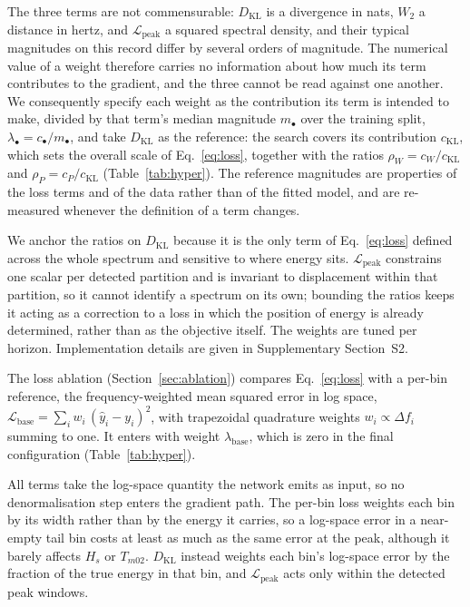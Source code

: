 The three terms are not commensurable: $D_{\text{KL}}$ is a divergence in nats, $W_2$ a distance in hertz, and $\mathcal{L}_{\text{peak}}$ a squared spectral density, and their typical magnitudes on this record differ by several orders of magnitude. The numerical value of a weight therefore carries no information about how much its term contributes to the gradient, and the three cannot be read against one another. We consequently specify each weight as the contribution its term is intended to make, divided by that term's median magnitude $m_\bullet$ over the training split, $\lambda_\bullet = c_\bullet / m_\bullet$, and take $D_{\text{KL}}$ as the reference: the search covers its contribution $c_{\text{KL}}$, which sets the overall scale of Eq.~\eqref{eq:loss}, together with the ratios $\rho_W = c_W / c_{\text{KL}}$ and $\rho_P = c_P / c_{\text{KL}}$ (Table~\ref{tab:hyper}). The reference magnitudes are properties of the loss terms and of the data rather than of the fitted model, and are re-measured whenever the definition of a term changes.

We anchor the ratios on $D_{\text{KL}}$ because it is the only term of Eq.~\eqref{eq:loss} defined across the whole spectrum and sensitive to where energy sits. $\mathcal{L}_{\text{peak}}$ constrains one scalar per detected partition and is invariant to displacement within that partition, so it cannot identify a spectrum on its own; bounding the ratios keeps it acting as a correction to a loss in which the position of energy is already determined, rather than as the objective itself. The weights are tuned per horizon. Implementation details are given in Supplementary Section~S2.

The loss ablation (Section~\ref{sec:ablation}) compares Eq.~\eqref{eq:loss} with a per-bin reference, the frequency-weighted mean squared error in log space, $\mathcal{L}_{\text{base}} = \sum_i w_i\,(\hat{y}_i - y_i)^2$, with trapezoidal quadrature weights $w_i \propto \Delta f_i$ summing to one. It enters with weight $\lambda_{\text{base}}$, which is zero in the final configuration (Table~\ref{tab:hyper}).

All terms take the log-space quantity the network emits as input, so no denormalisation step enters the gradient path. The per-bin loss weights each bin by its width rather than by the energy it carries, so a log-space error in a near-empty tail bin costs at least as much as the same error at the peak, although it barely affects $H_s$ or $T_{m02}$. $D_{\text{KL}}$ instead weights each bin's log-space error by the fraction of the true energy in that bin, and $\mathcal{L}_{\text{peak}}$ acts only within the detected peak windows.

